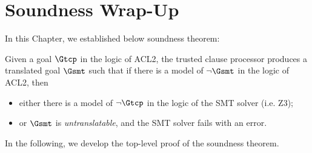 \section{Soundness Wrap-Up}\label{sec:soundconcl}
In this Chapter, we established below soundness theorem:
\begin{theorem}
  Given a goal $\Gtcp$ in the logic of ACL2, the trusted clause processor
  produces a translated goal $\Gsmt$ such that if there is a model of
  $\neg \Gsmt$ in the logic of ACL2, then
  \begin{itemize}
  \item either there is a model of $\neg \Gtcp$ in the logic of the \acs{SMT}
    solver (i.e. Z3);
   \item or $\Gsmt$ is \emph{untranslatable}, and the \acs{SMT} solver fails
     with an error.
  \end{itemize}
\end{theorem}

In the following, we develop the top-level proof of the soundness theorem.

